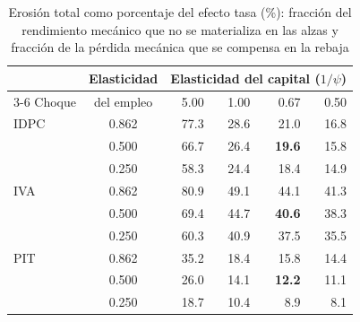 \documentclass[11pt]{article}
\begin{document}
\begin{table}[H]
\centering
\caption{Erosión total como porcentaje del efecto tasa (\%): fracción del rendimiento mecánico que no se materializa en las alzas y fracción de la pérdida mecánica que se compensa en la rebaja}
\label{tab:sens-erosion}
\small
\begin{tabular}{|l|c|r|r|r|r|}
  \hline
  & Elasticidad & \multicolumn{4}{c|}{Elasticidad del capital ($1/\psi$)} \\
  \cline{3-6}
  Choque & del empleo & 5.00 & 1.00 & 0.67 & 0.50 \\
  \hline
  IDPC & 0.862 & 77.3 & 28.6 & 21.0 & 16.8 \\
  & 0.500 & 66.7 & 26.4 & \textbf{19.6} & 15.8 \\
  & 0.250 & 58.3 & 24.4 & 18.4 & 14.9 \\
  \hline
  IVA & 0.862 & 80.9 & 49.1 & 44.1 & 41.3 \\
  & 0.500 & 69.4 & 44.7 & \textbf{40.6} & 38.3 \\
  & 0.250 & 60.3 & 40.9 & 37.5 & 35.5 \\
  \hline
  PIT & 0.862 & 35.2 & 18.4 & 15.8 & 14.4 \\
  & 0.500 & 26.0 & 14.1 & \textbf{12.2} & 11.1 \\
  & 0.250 & 18.7 & 10.4 & 8.9 & 8.1 \\
  \hline
\end{tabular}
\end{table}
\end{document}
